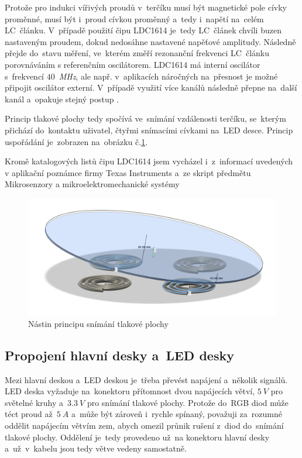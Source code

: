 Protože pro indukci vířivých proudů v~terčíku musí být magnetické pole cívky proměnné, musí být i~proud cívkou proměnný a~tedy i~napětí na~celém LC~článku.
V~případě použití čipu LDC1614 je~tedy LC~článek chvíli buzen nastaveným proudem, dokud nedosáhne nastavené napěťové amplitudy.
Následně přejde do~stavu měření, ve~kterém změří rezonanční frekvenci LC~článku porovnáváním s referenčním oscilátorem.
LDC1614 má interní oscilátor s~frekvencí \(40\)~{\itshape MHz}, ale např. v~aplikacích náročných na~přesnost je možné připojit oscilátor externí. 
V~případě využití více kanálů následně přepne na~další kanál a~opakuje stejný postup \cite{LDC1614}.

Princip tlakové plochy tedy spočívá ve~snímání vzdálenosti terčíku, se~kterým přichází do~kontaktu uživatel, čtyřmi snímacími cívkami na~LED desce.
Princip uspořádání je~zobrazen na~obrázku č.\ref{fig:nastin-tlakovky}.

Kromě katalogových listů čipu LDC1614 jsem vycházel i~z~informací uvedených v aplikační poznámce firmy Texas Instruments \cite{LDC1614SensorDesign} a~ze skript předmětu Mikrosenzory a mikroelektromechanické systémy \cite{SkriptaMMS}

\begin{figure}[h!]
    \centering
    \includegraphics[width=\textwidth]{text/PraktickaCast/img/naklonena-tlakovka.png}
    \caption{Nástin principu snímání tlakové plochy}
    \label{fig:nastin-tlakovky}
\end{figure}

\subsection{Propojení hlavní desky a~LED desky}
Mezi hlavní deskou a~LED deskou je~třeba převést napájení a~několik signálů.
LED deska vyžaduje na~konektoru přítomnost dvou napájecích větví, \(5~V\) pro světelné kruhy a~\(3.3~V\) pro snímání tlakové plochy.
Protože do~RGB diod může téct proud až~\(5~A\) a~může být zároveň i~rychle spínaný, považuji za~rozumné oddělit napájecím větvím zem, abych omezil průnik rušení z~diod do~snímání tlakové plochy.
Oddělení je~tedy provedeno už~na konektoru hlavní desky a~už~v~kabelu jsou tedy větve vedeny samostatně.

